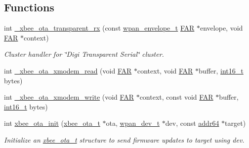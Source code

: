 \subsection*{Functions}
\begin{DoxyCompactItemize}
\item 
int \hyperlink{group__xbee__ota__client_ga8d196639e5234b3a56eb5c00ae730261}{\+\_\+xbee\+\_\+ota\+\_\+transparent\+\_\+rx} (const \hyperlink{structwpan__envelope__t}{wpan\+\_\+envelope\+\_\+t} \hyperlink{group__hal_gaef060b3456fdcc093a7210a762d5f2ed}{F\+AR} $\ast$envelope, void \hyperlink{group__hal_gaef060b3456fdcc093a7210a762d5f2ed}{F\+AR} $\ast$context)
\begin{DoxyCompactList}\small\item\em Cluster handler for \char`\"{}\+Digi Transparent Serial\char`\"{} cluster. \end{DoxyCompactList}\item 
int \hyperlink{group__xbee__ota__client_ga1e29a78ac03e3450859847d4a5e3b73b}{\+\_\+xbee\+\_\+ota\+\_\+xmodem\+\_\+read} (void \hyperlink{group__hal_gaef060b3456fdcc093a7210a762d5f2ed}{F\+AR} $\ast$context, void \hyperlink{group__hal_gaef060b3456fdcc093a7210a762d5f2ed}{F\+AR} $\ast$buffer, \hyperlink{group__hal__dos_ga2140805d08462d474b82ddc8d1c2f3e6}{int16\+\_\+t} bytes)
\item 
int \hyperlink{group__xbee__ota__client_ga88905a78517417dd42f6356038717d01}{\+\_\+xbee\+\_\+ota\+\_\+xmodem\+\_\+write} (void \hyperlink{group__hal_gaef060b3456fdcc093a7210a762d5f2ed}{F\+AR} $\ast$context, const void \hyperlink{group__hal_gaef060b3456fdcc093a7210a762d5f2ed}{F\+AR} $\ast$buffer, \hyperlink{group__hal__dos_ga2140805d08462d474b82ddc8d1c2f3e6}{int16\+\_\+t} bytes)
\item 
int \hyperlink{group__xbee__ota__client_ga4805b029d840b86133ef62d64866c6af}{xbee\+\_\+ota\+\_\+init} (\hyperlink{structxbee__ota__t}{xbee\+\_\+ota\+\_\+t} $\ast$ota, \hyperlink{structwpan__dev__t}{wpan\+\_\+dev\+\_\+t} $\ast$dev, const \hyperlink{unionaddr64}{addr64} $\ast$target)
\begin{DoxyCompactList}\small\item\em Initialize an \hyperlink{structxbee__ota__t}{xbee\+\_\+ota\+\_\+t} structure to send firmware updates to {\ttfamily target} using {\ttfamily dev}. \end{DoxyCompactList}\end{DoxyCompactItemize}
